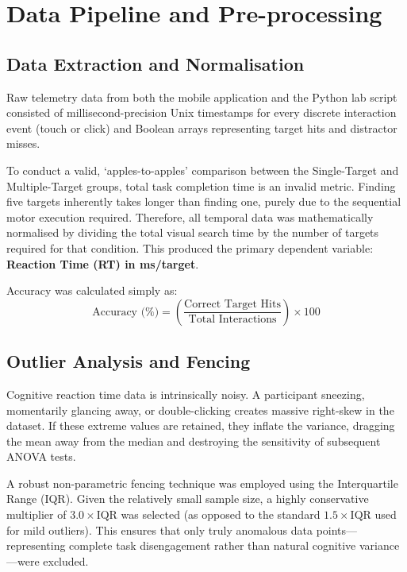 \documentclass[11pt,a4paper]{article}
\begin{document}
\section{Data Pipeline and Pre-processing}
\label{sec:pipeline}

\subsection{Data Extraction and Normalisation}
Raw telemetry data from both the mobile application and the Python lab script consisted of millisecond-precision Unix timestamps for every discrete interaction event (touch or click) and Boolean arrays representing target hits and distractor misses. 

To conduct a valid, `apples-to-apples' comparison between the Single-Target and Multiple-Target groups, total task completion time is an invalid metric. Finding five targets inherently takes longer than finding one, purely due to the sequential motor execution required. Therefore, all temporal data was mathematically normalised by dividing the total visual search time by the number of targets required for that condition. This produced the primary dependent variable: \textbf{Reaction Time (RT) in ms/target}. 

Accuracy was calculated simply as: 
\[ \text{Accuracy (\%)} = \left( \frac{\text{Correct Target Hits}}{\text{Total Interactions}} \right) \times 100 \]

\subsection{Outlier Analysis and Fencing}
Cognitive reaction time data is intrinsically noisy. A participant sneezing, momentarily glancing away, or double-clicking creates massive right-skew in the dataset. If these extreme values are retained, they inflate the variance, dragging the mean away from the median and destroying the sensitivity of subsequent ANOVA tests.

A robust non-parametric fencing technique was employed using the Interquartile Range (IQR). Given the relatively small sample size, a highly conservative multiplier of $3.0 \times \mathrm{IQR}$ was selected (as opposed to the standard $1.5 \times \mathrm{IQR}$ used for mild outliers). This ensures that only truly anomalous data points—representing complete task disengagement rather than natural cognitive variance—were excluded. 
\end{document}
